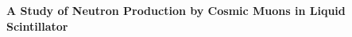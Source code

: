 
\begin{center}



\begin{description}
\bigskip
\end{description}

{ \huge \bfseries A Study of Neutron Production by Cosmic Muons in Liquid Scintillator \\[0.4cm] }

\end{center}


